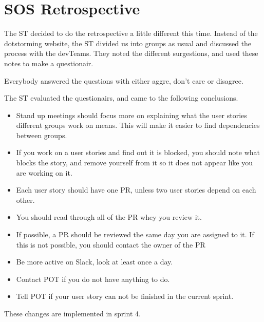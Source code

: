\section{SOS Retrospective}

The \gls{ST} decided to do the retrospective a little different this time. Instead of the dotstorming website, the \gls{ST} divided us into groups as usual and discussed the process with the \glspl{devTeam}. They noted the different surgestions, and used these notes to make a questionair. 

Everybody answered the questions with either aggre, don't care or disagree. 

The \gls{ST} evaluated the questionairs, and came to the following conclusions. 

\begin{itemize}
    \item Stand up meetings should focus more on explaining what the user stories different groups work on means. This will make it easier to find dependencies between groups. 
    \item If you work on a user stories and find out it is blocked, you should note what blocks the story, and remove yourself from it so it does not appear like you are working on it.
    \item Each user story should have one \gls{PR}, unless two user stories depend on each other. 
    \item You should read through all of the \gls{PR} whey you review it.
    \item If possible, a \gls{PR} should be reviewed the same day you are assigned to it. If this is not possible, you should contact the owner of the \gls{PR}
    \item Be more active on Slack, look at least once a day.
    \item Contact \gls{POT} if you do not have anything to do.
    \item Tell \gls{POT} if your user story can not be finished in the current sprint. 
\end{itemize}

These changes are implemented in sprint 4. 